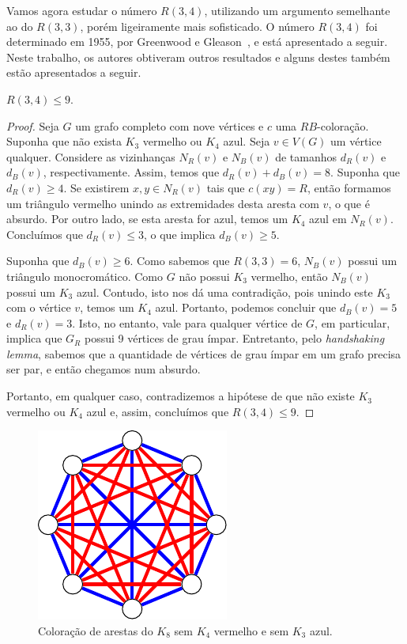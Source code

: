 Vamos agora estudar o número $R(3,4)$, utilizando um argumento semelhante ao do $R(3,3)$, porém ligeiramente mais sofisticado. O número $R(3,4)$ foi determinado em 1955, por Greenwood e Gleason~\cite{greenwood}, e está apresentado a seguir. Neste trabalho, os autores obtiveram outros resultados e alguns destes também estão apresentados a seguir.

\begin{proposition}
\label{prelim:thm:r34}
$R(3,4) \leq 9$.
\end{proposition}
\begin{proof}
Seja $G$ um grafo completo com nove vértices e $c$ uma $RB$-coloração.
Suponha que não exista $K_3$ vermelho ou $K_4$ azul. Seja $v \in V(G)$ um vértice qualquer. Considere as vizinhanças $N_R(v)$ e $N_B(v)$ de tamanhos $d_R(v)$ e $d_B(v)$, respectivamente. Assim, temos que $d_R(v) + d_B(v) = 8$. Suponha que $d_R(v) \geq 4$. Se existirem $x,y \in N_R(v)$ tais que $c(xy) = R$, então formamos um triângulo vermelho unindo as extremidades desta aresta com $v$, o que é absurdo. Por outro lado, se esta aresta for azul, temos um $K_4$ azul em $N_R(v)$. Concluímos que $d_R(v) \leq 3$, o que implica $d_B(v) \geq 5$.

Suponha que $d_B(v) \geq 6$. Como sabemos que $R(3,3) = 6$, $N_B(v)$ possui um triângulo monocromático. Como $G$ não possui $K_3$ vermelho, então $N_B(v)$ possui um $K_3$ azul. Contudo, isto nos dá uma contradição, pois unindo este $K_3$ com o vértice $v$, temos um $K_4$ azul. Portanto, podemos concluir que $d_B(v) = 5$ e $d_R(v) = 3$. Isto, no entanto, vale para qualquer vértice de $G$, em particular, implica que $G_R$ possui 9 vértices de grau ímpar.
Entretanto, pelo \emph{handshaking lemma}, sabemos que a quantidade de vértices de grau ímpar em um grafo precisa ser par, e então chegamos num absurdo.

Portanto, em qualquer caso, contradizemos a hipótese de que não existe $K_3$ vermelho ou $K_4$ azul e, assim, concluímos que $R(3,4) \leq 9$.
\end{proof}

\begin{figure}[ht!]
\centering
\includegraphics{figures/2_prelim_1_r34lb}
\caption{Coloração de arestas do $K_8$ sem $K_4$ vermelho e sem $K_3$ azul.}
\label{prelim:fig:exr34}
\end{figure}

